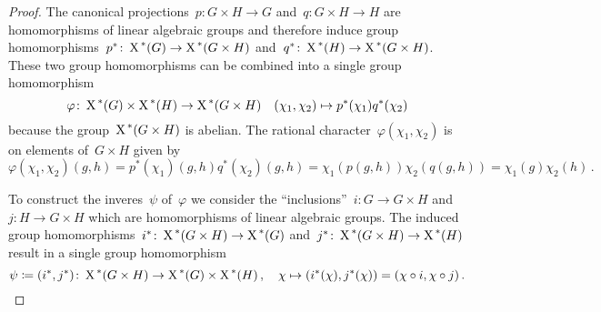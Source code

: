 \begin{proof}
  The canonical projections~$p \colon G \times H \to G$ and~$q \colon G \times H \to H$ are homomorphisms of linear algebraic groups and therefore induce group homomorphisms~$p^* \colon \operatorname{X}^{\,*}(G) \to \operatorname{X}^{\,*}(G \times H)$ and~$q^* \colon \operatorname{X}^{\,*}(H) \to \operatorname{X}^{\,*}(G \times H)$.
  These two group homomorphisms can be combined into a single group homomorphism
  \[
            \varphi
    \colon  \operatorname{X}^{\,*}(G) \times \operatorname{X}^{\,*}(H)
    \to     \operatorname{X}^{\,*}(G \times H)
    \quad   (\chi_1, \chi_2)
    \mapsto p^*(\chi_1) q^*(\chi_2)
  \]
  because the group~$\operatorname{X}^{\,*}(G \times H)$ is abelian.
  The rational character~$\varphi(\chi_1, \chi_2)$ is on elements of~$G \times H$ given by
  \[
      \varphi(\chi_1, \chi_2)(g,h)
    = p^*(\chi_1)(g,h) q^*(\chi_2)(g,h)
    = \chi_1(p(g,h)) \chi_2(q(g,h))
    = \chi_1(g) \chi_2(h) \,.
  \]
  
  To construct the inveres~$\psi$ of~$\varphi$ we consider the \enquote{inclusions}~$i \colon G \to G \times H$ and~$j \colon H \to G \times H$ which are homomorphisms of linear algebraic groups.
  The induced group homomorphisms~$i^* \colon \operatorname{X}^{\,*}(G \times H) \to \operatorname{X}^{\,*}(G)$ and~$j^* \colon \operatorname{X}^{\,*}(G \times H) \to \operatorname{X}^{\,*}(H)$ result in a single group homomorphism
  \[
              \psi
    \coloneqq  (i^*, j^*)
    \colon    \operatorname{X}^{\,*}(G \times H)
    \to       \operatorname{X}^{\,*}(G) \times \operatorname{X}^{\,*}(H) \,,
    \quad     \chi
    \mapsto   (i^*(\chi), j^*(\chi))
    =         (\chi \circ i, \chi \circ j) \,.
  \]
  

\end{proof}
